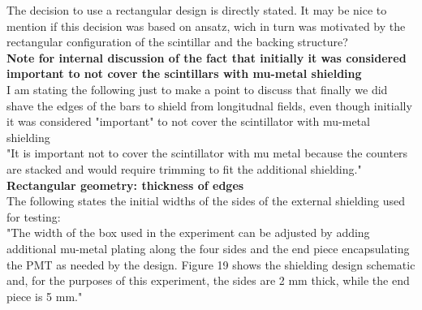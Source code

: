 \documentclass[12pt]{article}
\begin{document}
\newline
The decision to use a rectangular design is directly stated. It may be nice to mention if this decision was based on ansatz, wich in turn was motivated by the rectangular configuration of the scintillar and the backing structure?\\
\newline
\textbf{Note for internal discussion of the fact that initially it was considered important to not cover the scintillars with mu-metal shielding} \\
I am stating the following just to make a point to discuss that finally we did shave the edges of the bars to shield from longitudnal fields, even though initially it was considered "important" to not cover the scintillator with mu-metal shielding\\
\newline
"It is important not to cover the scintillator with mu metal because the counters are stacked and would require trimming to fit the additional shielding." \\
\newline
\textbf{Rectangular geometry: thickness of edges} \\
The following states the initial widths of the sides of the external shielding used for testing:\\
\newline
"The width of the box used in the experiment can be adjusted by adding additional mu-metal plating along the four sides and the end piece encapsulating the PMT as needed by the design. Figure 19 shows the shielding design schematic and, for the purposes of this experiment, the sides are 2 mm thick, while the end piece is 5 mm."
\newline
\end{document}
